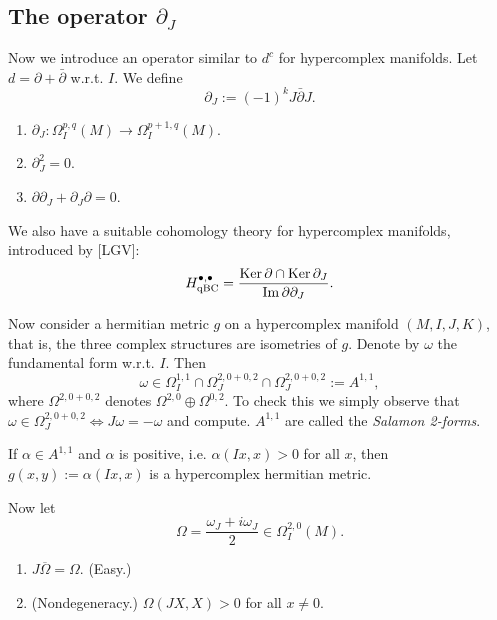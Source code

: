 \subsection{The operator $\partial_J$}
\label{subsection-partial-j}

\medskip\noindent
Now we introduce an operator
similar to $d^c$ for hypercomplex manifolds.
Let $d = \partial + \bar\partial$ w.r.t.
$I$. We define
$$
\partial_J:= (-1)^k J \bar\partial J.
$$
\begin{proposition}
\label{proposition-twisted-j}
\begin{enumerate}
\item $\partial_J: \Omega^{p,q}_I(M)
\to \Omega^{p+1,q}_I(M)$.

\item $\partial_J^2=0$.

\item $\partial \partial_J
+ \partial_J \partial=0$.
\end{enumerate}
\end{proposition}

\medskip\noindent
We also have a suitable cohomology
theory for hypercomplex manifolds,
introduced by [LGV]:
$$
H_{\operatorname{qBC}}^{\bullet,\bullet}
=
\frac{\mathop{\mathrm{Ker}} \partial \cap \mathop{\mathrm{Ker}} \partial_J}{
\operatorname{Im} \partial \partial_J}.
$$

\medskip\noindent
Now consider a hermitian metric $g$
on a hypercomplex manifold 
$(M,I,J,K)$, that is, the three
complex structures are isometries of $g$.
Denote by $\omega$ the fundamental
form w.r.t. $I$. Then
$$
\omega \in
\Omega^{1,1}_I
\cap \Omega^{2,0+0,2}_J
\cap \Omega^{2,0+0,2}_J
:= A^{1,1},
$$
where $\Omega^{2,0+0,2}$ denotes 
$\Omega^{2,0}\oplus \Omega^{0,2}$.
To check this we simply observe that
$\omega \in \Omega^{2,0+0,2}_J \iff
J\omega=-\omega$ and compute.
$A^{1,1}$ are called the
{\it Salamon 2-forms}.

If $\alpha \in A^{1,1}$ and $\alpha$
is positive, i.e.
$\alpha(Ix,x)>0$ for all $x$,
then $g(x,y):=\alpha(Ix,x)$
is a hypercomplex hermitian metric.

\medskip\noindent
Now let
$$
\Omega=\frac{\omega_J+i \omega_J}{2}
\in \Omega^{2,0}_I(M).
$$
\begin{proposition}
\label{proposition-properties-omega}
\begin{enumerate}
\item $J\overline{\Omega}=\Omega$. (Easy.)
\item (Nondegeneracy.)
$\Omega(JX,X)>0$ for all $x\neq 0$.
\end{enumerate}
\end{proposition}

